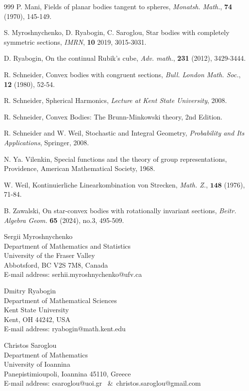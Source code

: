 \documentclass[11pt]{article}
\theoremstyle{definition}
\begin{document}
\begin{thebibliography}{999}
	 P. Mani, Fields of planar bodies tangent
	to spheres, \emph{Monatsh. Math.}, {\bf 74} (1970), 145-149.
	
	
	 S. Myroshnychenko, D. Ryabogin, C. Saroglou, Star bodies with completely symmetric sections, \emph{IMRN}, {\bf 10} 2019, 3015-3031.
	
	
	
	
	D. Ryabogin, On the continual Rubik's cube, \emph{Adv. math.}, {\bf 231} (2012), 3429-3444.

	R. Schneider, Convex bodies with congruent sections, \emph{Bull. London Math. Soc.},
	{\bf 12} (1980), 52-54.
	
	R. Schneider, Spherical Harmonics, \emph{Lecture at Kent State University}, 2008.

	
	R. Schneider, Convex Bodies: The Brunn-Minkowski
	theory, 2nd Edition.
	
	R. Schneider and W. Weil, Stochastic and Integral Geometry, \emph{Probability and Its Applications}, Springer, 2008.
	
	N. Ya. Vilenkin, Special functions and the theory of group representations,  Providence, American Mathematical Society, 1968.
	
	W. Weil, Kontinuierliche Linearkombination von
	Strecken, \emph{Math. Z.}, $\textbf{148}$ (1976), 71-84.
	
	
	B. Zawalski, On star-convex bodies with rotationally invariant sections, \emph{Beitr. Algebra Geom.} {\bf 65} (2024), no.3, 495-509.
	
	
	
	
	
\end{thebibliography}


\vspace{0.8 cm}

\noindent Sergii Myroshnychenko\\
Department of Mathematics and Statistics\\
University of the Fraser Valley\\
Abbotsford, BC V2S 7M8, Canada\\
E-mail address: serhii.myroshnychenko@ufv.ca

\vspace{0.5 cm}

\noindent Dmitry Ryabogin \\
Department of Mathematical Sciences\\
Kent State University\\
Kent, OH 44242, USA \\
E-mail address: ryabogin@math.kent.edu

\vspace{0.5 cm}

\noindent Christos Saroglou \\
Department of Mathematics \\
University of Ioannina\\
Panepistimioupoli, Ioannina 45110, Greece\\
E-mail address: csaroglou@uoi.gr \ \&\ christos.saroglou@gmail.com

\end{document}
